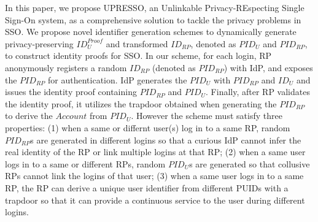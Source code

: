 In this paper, we propose UPRESSO, an Unlinkable Privacy-REspecting Single Sign-On system, as a comprehensive solution to tackle the privacy problems in SSO. We propose novel identifier generation schemes to dynamically generate  privacy-preserving $ID_U^{Proof}$ and transformed $ID_{RP}$, denoted as $PID_U$ and $PID_{RP}$, to construct identity proofs for SSO. In our scheme, for each login, RP anonymously registers a random $ID_{RP}$ (denoted as $PID_{RP}$) with IdP, and exposes the $PID_{RP}$ for authentication. IdP generates the $PID_U$ with $PID_{RP}$ and $ID_U$ and issues the identity proof containing $PID_{RP}$ and $PID_U$. Finally, after RP validates the identity proof, it utilizes the trapdoor obtained when generating the $PID_{RP}$ to derive the $Account$ from $PID_U$. However the scheme must satisfy three properties: (1) when a same or differnt user(s) log in to a same RP, random $PID_{RP}$s are generated in different logins so that a curious IdP cannot infer the real identity of the RP or link multiple logins at that RP; (2) when a same user logs in to a same or different RPs, random $PID_U$s are generated so that collusive RPs cannot link the logins of that user; (3) when a same user logs in to a same RP, the RP can derive a unique user identifier from different PUIDs with a trapdoor so that it can provide a continuous service to the user during different logins.

